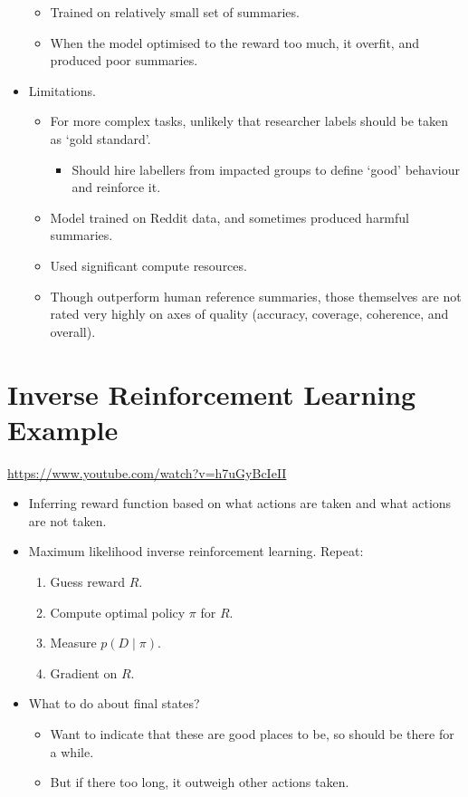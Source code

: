 \begin{itemize}
\begin{itemize}
        \item Trained on relatively small set of summaries.
        \item When the model optimised to the reward too much, it overfit, and produced poor summaries.
    \end{itemize}
    \item Limitations.
    \begin{itemize}
        \item For more complex tasks, unlikely that researcher labels should be taken as `gold standard'.
        \begin{itemize}
            \item Should hire labellers from impacted groups to define `good' behaviour and reinforce it.
        \end{itemize}
        \item Model trained on Reddit data, and sometimes produced harmful summaries.
        \item Used significant compute resources.
        \item Though outperform human reference summaries, those themselves are not rated very highly on axes of quality (accuracy, coverage, coherence, and overall).
    \end{itemize}
\end{itemize}


\section{Inverse Reinforcement Learning Example}

\url{https://www.youtube.com/watch?v=h7uGyBcIeII}

\begin{itemize}
    \item Inferring reward function based on what actions are taken and what actions are not taken.
    \item Maximum likelihood inverse reinforcement learning. Repeat:
    \begin{enumerate}[label=(\roman*)]
        \item Guess reward $R$.
        \item Compute optimal policy $\pi$ for $R$.
        \item Measure $p(D \mid \pi)$.
        \item Gradient on $R$.
    \end{enumerate}
    \item What to do about final states?
    \begin{itemize}
        \item Want to indicate that these are good places to be, so should be there for a while.
        \item But if there too long, it outweigh other actions taken.
    \end{itemize}
\end{itemize}